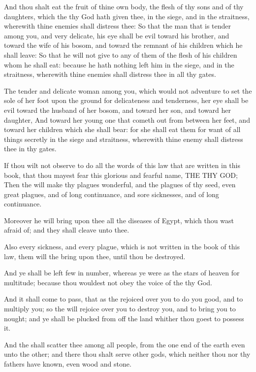 \Verse And thou shalt eat the fruit of thine own body, the flesh of thy sons and of thy daughters, which the \LORD thy God hath given thee, in the siege, and in the straitness, wherewith thine enemies shall distress thee: \Verse So that the man that is tender among you, and very delicate, his eye shall be evil toward his brother, and toward the wife of his bosom, and toward the remnant of his children which he shall leave: \Verse So that he will not give to any of them of the flesh of his children whom he shall eat: because he hath nothing left him in the siege, and in the straitness, wherewith thine enemies shall distress thee in all thy gates.

\Verse The tender and delicate woman among you, which would not adventure to set the sole of her foot upon the ground for delicateness and tenderness, her eye shall be evil toward the husband of her bosom, and toward her son, and toward her daughter, \Verse And toward her young one that cometh out from between her feet, and toward her children which she shall bear: for she shall eat them for want of all things secretly in the siege and straitness, wherewith thine enemy shall distress thee in thy gates.

\Verse If thou wilt not observe to do all the words of this law that are written in this book, that thou mayest fear this glorious and fearful name, THE \LORD THY GOD; \Verse Then the \LORD will make thy plagues wonderful, and the plagues of thy seed, even great plagues, and of long continuance, and sore sicknesses, and of long continuance.

\Verse Moreover he will bring upon thee all the diseases of Egypt, which thou wast afraid of; and they shall cleave unto thee.

\Verse Also every sickness, and every plague, which is not written in the book of this law, them will the \LORD bring upon thee, until thou be destroyed.

\Verse And ye shall be left few in number, whereas ye were as the stars of heaven for multitude; because thou wouldest not obey the voice of the \LORD thy God.

\Verse And it shall come to pass, that as the \LORD rejoiced over you to do you good, and to multiply you; so the \LORD will rejoice over you to destroy you, and to bring you to nought; and ye shall be plucked from off the land whither thou goest to possess it.

\Verse And the \LORD shall scatter thee among all people, from the one end of the earth even unto the other; and there thou shalt serve other gods, which neither thou nor thy fathers have known, even wood and stone.

